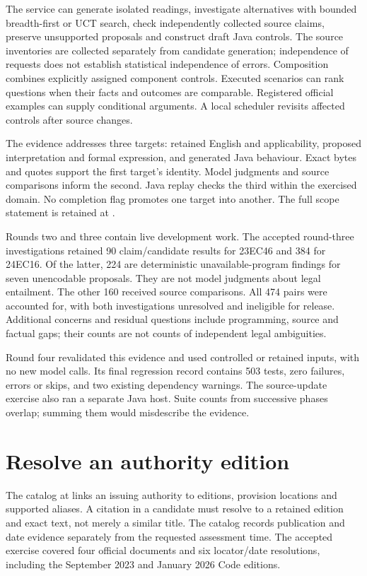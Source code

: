 \documentclass[12pt,a4paper,oneside,openany]{book}
\begin{document}
The service can generate isolated readings, investigate alternatives with bounded
breadth-first or UCT search, check independently collected source claims, preserve
unsupported proposals and construct draft Java controls. The source inventories
are collected separately from candidate generation; independence of requests
does not establish statistical independence of errors. Composition combines
explicitly assigned component controls. Executed scenarios can rank questions
when their facts and outcomes are comparable. Registered official examples can
supply conditional arguments. A local scheduler revisits affected controls after
source changes.

The evidence addresses three targets: retained English and applicability,
proposed interpretation and formal expression, and generated Java behaviour.
Exact bytes and quotes support the first target's identity. Model judgments
and source comparisons inform the second. Java replay checks the third within
the exercised domain. No completion flag promotes one target into another.
The full scope statement is retained at
.

Rounds two and three contain live development work. The accepted round-three
investigations retained 90 claim/candidate results for 23EC46 and 384 for 24EC16.
Of the latter, 224 are deterministic unavailable-program findings for seven
unencodable proposals. They are not model judgments about legal entailment.
The other 160 received source comparisons. All 474 pairs were accounted for,
with both investigations unresolved and ineligible for release. Additional
concerns and residual questions include programming, source and factual gaps;
their counts are not counts of independent legal ambiguities.

Round four revalidated this evidence and used controlled or retained inputs,
with no new model calls. Its final regression record contains 503 tests, zero
failures, errors or skips, and two existing dependency warnings. The source-update
exercise also ran a separate Java host. Suite counts from successive phases
overlap; summing them would misdescribe the evidence.

\section{Resolve an authority edition}

The catalog at  links an
issuing authority to editions, provision locations and supported aliases. A
citation in a candidate must resolve to a retained edition and exact text, not
merely a similar title. The catalog records publication and date evidence
separately from the requested assessment time. The accepted exercise covered
four official documents and six locator/date resolutions, including the
September 2023 and January 2026 Code editions.
\end{document}
